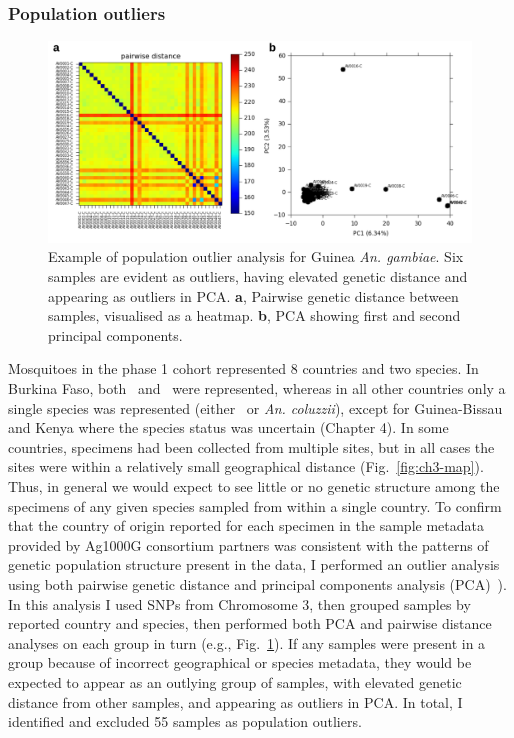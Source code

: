 \begin{refsection}
\subsubsection{Population outliers}


\begin{figure}[t!]
\centering
\includegraphics[width=\textwidth]{artwork/chapter3/popout.pdf}
\caption{Example of population outlier analysis for Guinea \textit{An. gambiae}.
%
Six samples are evident as outliers, having elevated genetic distance and appearing as outliers in PCA.
%
\textbf{a}, Pairwise genetic distance between samples, visualised as a heatmap.
%
\textbf{b}, PCA showing first and second principal components.
%
}
%
\label{fig:ch3-popout}
\end{figure}


Mosquitoes in the phase 1 cohort represented 8 countries and two species. 
%
In Burkina Faso, both \agam\ and \acol\ were represented, whereas in all other countries only a single species was represented (either \agam\ or \textit{An. coluzzii}), except for Guinea-Bissau and Kenya where the species status was uncertain (Chapter 4).
%
In some countries, specimens had been collected from multiple sites, but in all cases the sites were within a relatively small geographical distance (Fig.~\ref{fig:ch3-map}).
%
Thus, in general we would expect to see little or no genetic structure among the specimens of any given species sampled from within a single country.
%
To confirm that the country of origin reported for each specimen in the sample metadata provided by Ag1000G consortium partners was consistent with the patterns of genetic population structure present in the data, I performed an outlier analysis using both pairwise genetic distance and principal components analysis (PCA)~\parencite{Patterson2006}).
%
In this analysis I used SNPs from Chromosome 3, then grouped samples by reported country and species, then performed both PCA and pairwise distance analyses on each group in turn (e.g., Fig.~\ref{fig:ch3-popout}).
%
If any samples were present in a group because of incorrect geographical or species metadata, they would be expected to appear as an outlying group of samples, with elevated genetic distance from other samples, and appearing as outliers in PCA.
%
In total, I identified and excluded 55 samples as population outliers.



\end{refsection}
